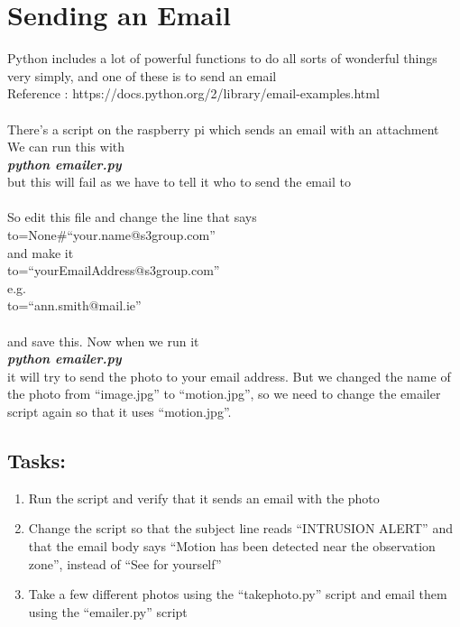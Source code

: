 \documentclass[a4paper]{article}
\begin{document}
\newpage\section{Sending an Email}
Python includes a lot of powerful functions to do all sorts of wonderful things very simply, and one of these is to send an email
\\
Reference : https://docs.python.org/2/library/email-examples.html
\\
\\
There's a script on the raspberry pi which sends an email with an attachment
\\
We can run this with \\
\emph{\textbf{python emailer.py}} \\
but this will fail as we have to tell it who to send the email to \\
\\
So edit this file and change the line that says \\
to=None\#``your.name@s3group.com'' \\
and make it\\
to=``yourEmailAddress@s3group.com''\\
e.g. \\
to=``ann.smith@mail.ie''\\
\\
and save this. Now when we run it \\
\emph{\textbf{python emailer.py}} \\
it will try to send the photo to your email address. But we changed the name of the photo from ``image.jpg'' to ``motion.jpg'', 
so we need to change the emailer script again so that it uses ``motion.jpg''. \\ 

\subsection{Tasks:}
\begin{enumerate}
\item Run the script and verify that it sends an email with the photo
\item Change the script so that the subject line reads ``INTRUSION ALERT'' and that the email body says ``Motion has been detected near the observation zone'', instead of ``See for yourself''
\item Take a few different photos using the ``takephoto.py'' script and email them using the ``emailer.py'' script
\end{enumerate}
\end{document}
